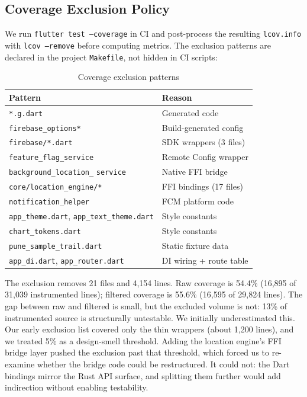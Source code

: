 \documentclass[10pt,journal,compsoc]{IEEEtran}
\begin{document}
\subsection{Coverage Exclusion Policy}
\label{sec:exclusion}

We run \texttt{flutter test --coverage} in CI and post-process the
resulting \texttt{lcov.info} with \texttt{lcov --remove} before computing
metrics. The exclusion patterns are declared in the project
\texttt{Makefile}, not hidden in CI scripts:

\begin{table}[h]
\caption{Coverage exclusion patterns}
\label{tab:exclusions}
\small
\begin{tabular}{@{}p{4.2cm}l@{}}
\toprule
Pattern & Reason \\
\midrule
\texttt{*.g.dart}          & Generated code \\
\texttt{firebase\_options*} & Build-generated config \\
\texttt{firebase/*.dart}   & SDK wrappers (3 files) \\
\texttt{feature\_flag\_service} & Remote Config wrapper \\
\texttt{background\_location\_} \texttt{service} & Native FFI bridge \\
\texttt{core/location\_engine/*} & FFI bindings (17 files) \\
\texttt{notification\_helper} & FCM platform code \\
\texttt{app\_theme.dart}, \texttt{app\_text\_theme.dart} & Style constants \\
\texttt{chart\_tokens.dart} & Style constants \\
\texttt{pune\_sample\_trail.dart} & Static fixture data \\
\texttt{app\_di.dart}, \texttt{app\_router.dart} & DI wiring + route table \\
\bottomrule
\end{tabular}
\end{table}

The exclusion removes 21 files and 4,154 lines. Raw coverage is 54.4\%
(16,895 of 31,039 instrumented lines); filtered coverage is 55.6\%
(16,595 of 29,824 lines). The gap between raw and filtered is small, but
the excluded volume is not: 13\% of instrumented source is structurally
untestable. We initially underestimated this. Our early exclusion list
covered only the thin wrappers (about 1,200 lines), and we treated 5\%
as a design-smell threshold. Adding the location engine's FFI bridge
layer pushed the exclusion past that threshold, which forced us to
re-examine whether the bridge code could be restructured. It could not:
the Dart bindings mirror the Rust API surface, and splitting them further
would add indirection without enabling testability.
\end{document}
